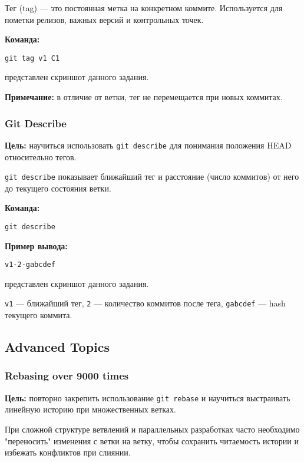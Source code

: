\documentclass[a4paper,12pt]{report}
\begin{document}
Тег (tag) — это постоянная метка на конкретном коммите. Используется для пометки релизов, важных версий и контрольных точек.

\textbf{Команда:}
\begin{verbatim}
git tag v1 C1
\end{verbatim}

 представлен скриншот данного задания.

\textbf{Примечание:} в отличие от ветки, тег не перемещается при новых коммитах.

\subsubsection{Git Describe}
\textbf{Цель:} научиться использовать \texttt{git describe} для понимания положения HEAD относительно тегов.

\texttt{git describe} показывает ближайший тег и расстояние (число коммитов) от него до текущего состояния ветки.

\textbf{Команда:}
\begin{verbatim}
git describe
\end{verbatim}

\textbf{Пример вывода:}
\begin{verbatim}
v1-2-gabcdef
\end{verbatim}

 представлен скриншот данного задания.

\texttt{v1} — ближайший тег, \texttt{2} — количество коммитов после тега, \texttt{gabcdef} — hash текущего коммита.

\subsection{Advanced Topics}

\subsubsection{Rebasing over 9000 times}
\textbf{Цель:} повторно закрепить использование \texttt{git rebase} и научиться выстраивать линейную историю при множественных ветках.

При сложной структуре ветвлений и параллельных разработках часто необходимо "переносить" изменения с ветки на ветку, чтобы сохранить читаемость истории и избежать конфликтов при слиянии.
\end{document}

